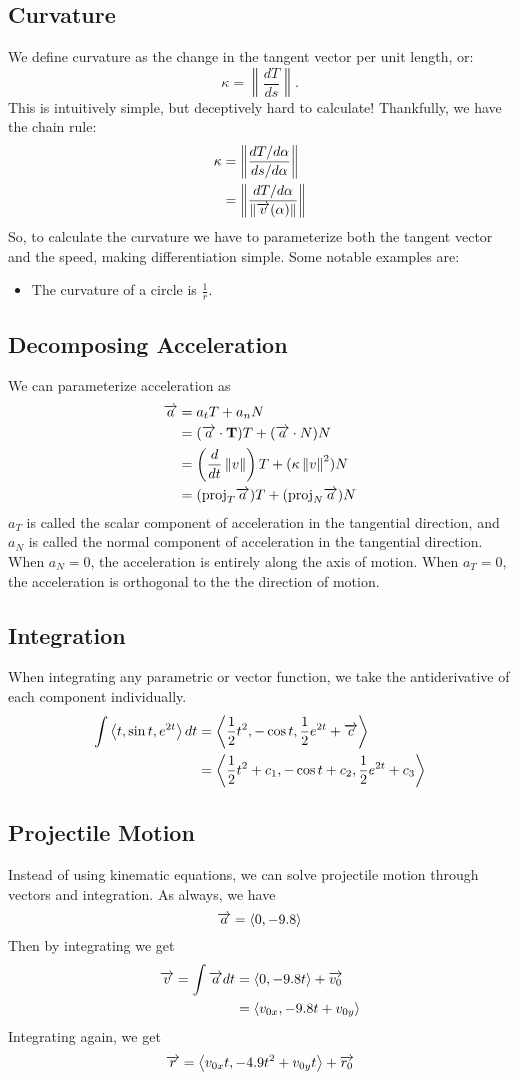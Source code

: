\documentclass[12pt]{article}
\theoremstyle{plain} %
\theoremstyle{definition}
\theoremstyle{definition}
\theoremstyle{remark}
\newcommand{\vecv}{\vv{v}}
\newcommand{\vecr}{\vv{r}}
\newcommand{\angled}[1]{\left\langle {#1} \right\rangle}
\newcommand*{\vv}[1]{\overrightarrow{\mkern0mu#1}}
\renewcommand{\norm}[1]{\left\lVert#1\right\rVert}
\newcommand{\ddt}{\frac{d}{dt}}
\begin{document}
\subsection{Curvature}
We define curvature as the change in the tangent vector per unit length, or:
\[ \kappa = \norm{\frac{dT}{ds}}. \]
This is intuitively simple, but deceptively hard to calculate! Thankfully, we have the chain rule:
\begin{align*}
    \kappa & = \norm{\frac{dT/d\alpha}{ds/d\alpha}} \\
    & = \norm{\frac{dT/d\alpha}{\norm{\vecv(\alpha)}}}
\end{align*}
So, to calculate the curvature we have to parameterize both the tangent vector and the speed, making differentiation simple. Some notable examples are:
\begin{itemize}
    \item The curvature of a circle is $\frac{1}{r}$.
\end{itemize}
\subsection{Decomposing Acceleration}
We can parameterize acceleration as
\begin{align*}
\vv{a} &= a_tT + a_nN \\
& = (\vv{a} \cdot \vb{T})T + (\vv{a} \cdot N)N \\
& = \left(\ddt \norm{v}\right)T + (\kappa \norm{v}^2)N \\
& = (\text{proj}_T\vv{a})T + (\text{proj}_N\vv{a})N
\end{align*}
$a_T$ is called the scalar component of acceleration in the tangential direction, and $a_N$ is called the normal component of acceleration in the tangential direction. When $a_N=0$, the acceleration is entirely along the axis of motion. When $a_T=0$, the acceleration is orthogonal to the the direction of motion.
\subsection{Integration}
When integrating any parametric or vector function, we take the antiderivative of each component individually.
\begin{align*}
    \int{\angled{t,\sin{t},e^{2t}}dt} &= \angled{\frac{1}{2}t^2,-\cos{t},\frac{1}{2}e^{2t} + \vv{c}} \\
    &= \angled{\frac{1}{2}t^2+c_1,-\cos{t}+c_2,\frac{1}{2}e^{2t}+c_3}
\end{align*}
\subsection{Projectile Motion}
Instead of using kinematic equations, we can solve projectile motion through vectors and integration. As always, we have
\[ \vv{a} = \angled{0,-9.8} \]
Then by integrating we get
\begin{align*}
    \vv{v} = \int{\vv{a}dt} &= \angled{0,-9.8t}+\vv{v_0} \\
    & = \angled{v_{0x},-9.8t + v_{0y}}
\end{align*}
Integrating again, we get
\[ \vecr = \angled{v_{0x}t,-4.9t^2 + v_{0y}t} + \vv{r_0} \]
\end{document}
